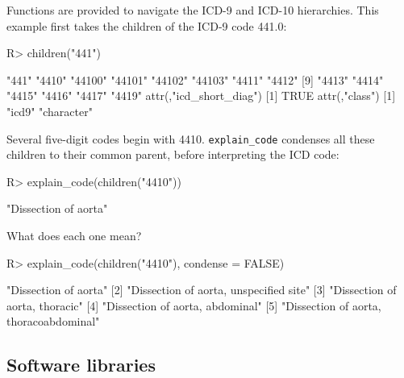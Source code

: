 \documentclass[article]{jss}
\begin{document}
Functions are provided to navigate the ICD-9 and ICD-10 hierarchies.
This example first takes the children of the ICD-9 code 441.0:

\begin{CodeChunk}

\begin{CodeInput}
R> children("441")
\end{CodeInput}

\begin{CodeOutput}
 [1] "441"   "4410"  "44100" "44101" "44102" "44103" "4411"  "4412" 
 [9] "4413"  "4414"  "4415"  "4416"  "4417"  "4419" 
attr(,"icd_short_diag")
[1] TRUE
attr(,"class")
[1] "icd9"      "character"
\end{CodeOutput}
\end{CodeChunk}

Several five-digit codes begin with 4410. \texttt{explain\_code}
condenses all these children to their common parent, before interpreting
the ICD code:

\begin{CodeChunk}

\begin{CodeInput}
R> explain_code(children("4410"))
\end{CodeInput}

\begin{CodeOutput}
[1] "Dissection of aorta"
\end{CodeOutput}
\end{CodeChunk}

What does each one mean?

\begin{CodeChunk}

\begin{CodeInput}
R> explain_code(children("4410"), condense = FALSE)
\end{CodeInput}

\begin{CodeOutput}
[1] "Dissection of aorta"                  
[2] "Dissection of aorta, unspecified site"
[3] "Dissection of aorta, thoracic"        
[4] "Dissection of aorta, abdominal"       
[5] "Dissection of aorta, thoracoabdominal"
\end{CodeOutput}
\end{CodeChunk}

\subsection{Software libraries}\label{software-libraries}
\end{document}
